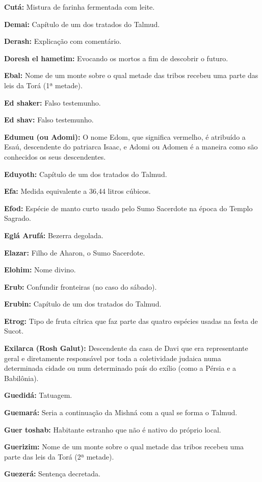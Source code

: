 \begin{hangparas}{.25in}{1}
{\textbf{Cutá:} Mistura de farinha fermentada com leite.

\textbf{Demai:} Capítulo de um dos tratados do Talmud.

\textbf{Derash:} Explicação com comentário.

\textbf{Doresh el hametim:} Evocando os mortos a fim de descobrir o futuro.

\textbf{Ebal:} Nome de um monte sobre o qual metade das tribos recebeu uma parte das leis da Torá (1ª metade).

\textbf{Ed shaker:} Falso testemunho.

\textbf{Ed shav:} Falso testemunho.

\textbf{Edumeu (ou Adomi):} O nome Edom, que significa vermelho, é
atribuído a Esaú, descendente do patriarca Isaac, e Adomi ou Adomen é
a maneira como são conhecidos os seus descendentes.

\textbf{Eduyoth:} Capítulo de um dos tratados do Talmud.

\textbf{Efa:} Medida equivalente a 36,44 litros cúbicos.

\textbf{Efod:} Espécie de manto curto usado pelo Sumo Sacerdote na
época do Templo Sagrado.

\textbf{Eglá Arufá:} Bezerra degolada.

\textbf{Elazar:} Filho de Aharon, o Sumo Sacerdote.

\textbf{Elohim:} Nome divino.

\textbf{Erub:} Confundir fronteiras (no caso do sábado).

\textbf{Erubin:} Capítulo de um dos tratados do Talmud.

\textbf{Etrog:} Tipo de fruta cítrica que faz parte das quatro espécies
usadas na festa de Sucot.

\textbf{Exilarca (Rosh Galut):} Descendente da casa de Davi que era
representante geral e diretamente responsável por toda a coletividade
judaica numa determinada cidade ou num determinado país do exílio (como
a Pérsia e a Babilônia).

\textbf{Guedidá:} Tatuagem.

\textbf{Guemará:} Seria a continuação da Mishná com a qual se forma o
Talmud.

\textbf{Guer toshab:} Habitante estranho que não é nativo do próprio local.

\textbf{Guerizim:} Nome de um monte sobre o qual metade das tribos recebeu uma parte das leis da Torá (2ª metade).

\textbf{Guezerá:} Sentença decretada.

}
\end{hangparas}
